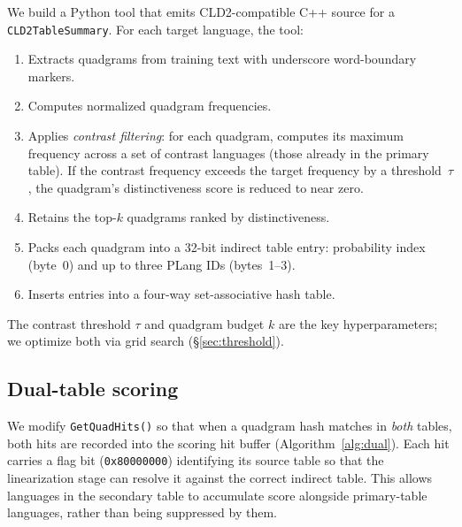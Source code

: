 \documentclass{article}
\begin{document}
We build a Python tool that emits CLD2-compatible C++ source for a \texttt{CLD2TableSummary}.
For each target language, the tool:
\begin{enumerate}
\item Extracts quadgrams from training text with underscore word-boundary markers.
\item Computes normalized quadgram frequencies.
\item Applies \emph{contrast filtering}: for each quadgram, computes its maximum frequency across a set of contrast languages (those already in the primary table). If the contrast frequency exceeds the target frequency by a threshold~$\tau$, the quadgram's distinctiveness score is reduced to near zero.
\item Retains the top-$k$ quadgrams ranked by distinctiveness.
\item Packs each quadgram into a 32-bit indirect table entry: probability index (byte~0) and up to three PLang IDs (bytes~1--3).
\item Inserts entries into a four-way set-associative hash table.
\end{enumerate}

The contrast threshold $\tau$ and quadgram budget $k$ are the key hyperparameters; we optimize both via grid search (\S\ref{sec:threshold}).

\subsection{Dual-table scoring}
\label{sec:dualtable}

We modify \texttt{GetQuadHits()} so that when a quadgram hash matches in \emph{both} tables, both hits are recorded into the scoring hit buffer (Algorithm~\ref{alg:dual}).
Each hit carries a flag bit (\texttt{0x80000000}) identifying its source table so that the linearization stage can resolve it against the correct indirect table.
This allows languages in the secondary table to accumulate score alongside primary-table languages, rather than being suppressed by them.
\end{document}
